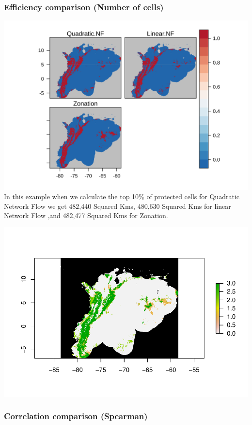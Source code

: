 \documentclass[]{article}
\begin{document}
\hypertarget{efficiency-comparison-number-of-cells}{%
\subsubsection{Efficiency comparison (Number of cells)}\label{efficiency-comparison-number-of-cells}}

\includegraphics{NFPaper_files/figure-latex/unnamed-chunk-4-1.png}
In this example when we calculate the top 10\% of protected cells for Quadratic Network Flow we get 482,440 Squared Kms, 480,630 Squared Kms for linear Network Flow ,and 482,477 Squared Kms for Zonation.

\includegraphics{NFPaper_files/figure-latex/unnamed-chunk-5-1.pdf}

\hypertarget{correlation-comparison-spearman}{%
\subsubsection{Correlation comparison (Spearman)}\label{correlation-comparison-spearman}}
\end{document}
